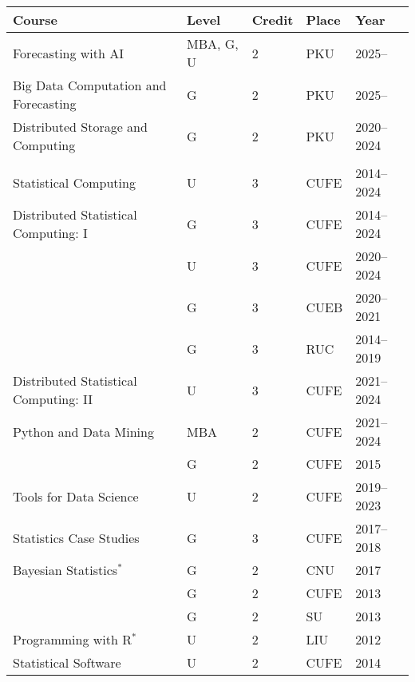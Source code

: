 \documentclass[twoside,a4paper]{article}
\begin{document}
\begin{center}
  \begin{tabular}{p{7.5cm}llll}
    \toprule
    Course                                & Level      & Credit & Place & Year       \\
    \midrule
    Forecasting with AI                   & MBA, G, U & 2      & PKU   & 2025--     \\
    Big Data Computation and Forecasting  & G          & 2      & PKU   & 2025--     \\
    Distributed Storage and Computing     & G          & 2      & PKU   & 2020--2024 \\
                                          &            &        &       &            \\
    Statistical Computing                 & U          & 3      & CUFE  & 2014--2024 \\
    Distributed Statistical Computing: I  & G          & 3      & CUFE  & 2014--2024 \\
                                          & U          & 3      & CUFE  & 2020--2024 \\
                                          & G          & 3      & CUEB  & 2020--2021 \\
                                          & G          & 3      & RUC   & 2014--2019 \\
    Distributed Statistical Computing: II & U          & 3      & CUFE  & 2021--2024 \\
    Python and Data Mining                & MBA        & 2      & CUFE  & 2021--2024 \\
                                          & G          & 2      & CUFE  & 2015       \\
    Tools for Data Science                & U          & 2      & CUFE  & 2019--2023 \\
    Statistics Case Studies               & G          & 3      & CUFE  & 2017--2018 \\
    Bayesian Statistics$^*$               & G          & 2      & CNU   & 2017       \\
                                          & G          & 2      & CUFE  & 2013       \\
                                          & G          & 2      & SU    & 2013       \\
    Programming with R$^*$                & U          & 2      & LIU   & 2012       \\
    Statistical Software                  & U          & 2      & CUFE  & 2014       \\

\end{tabular}
\end{center}
\end{document}
